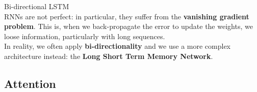 \documentclass[9pt]{beamer}
\begin{document}
\begin{frame}{Bi-directional LSTM}
\vspace{0.3cm}\\
    RNNs are not perfect: in particular, they suffer from the \textbf{vanishing gradient problem}. This is, when we back-propagate the error to update the weights, we loose information, particularly with long sequences.\\
    In reality, we often apply \textbf{bi-directionality} { and we use a more complex architecture instead: the \textbf{Long Short Term Memory Network}}.
\centering
{}
\end{frame}



\subsection{Attention}
\end{document}
